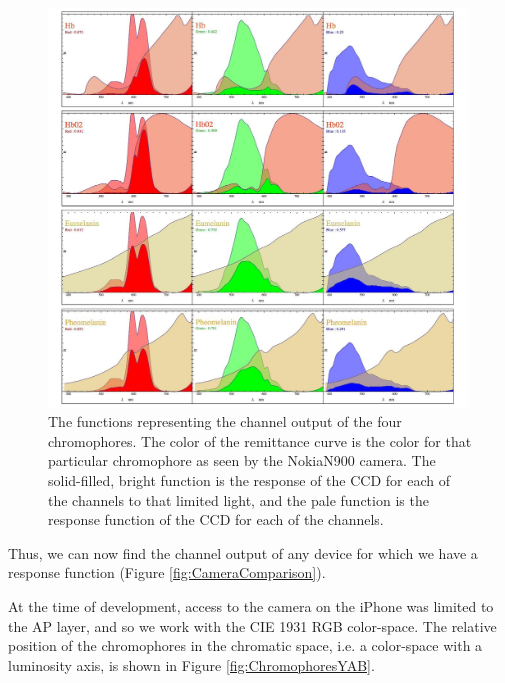 \begin{figure}[h!]
  \centering
    \includegraphics[width=0.99\textwidth]{Chapter1/Figs/Chromophores_NokiaN900.jpg}
    \caption{The functions representing the channel output of the four chromophores. The color of the remittance curve is the color for that particular chromophore as seen by the NokiaN900 camera. The solid-filled, bright function is the response of the CCD for each of the channels to that limited light, and the pale function is the response function of the CCD for each of the channels.}  \label{fig:Chromophores_NokiaN900}
\end{figure}



Thus, we can now find the channel output of any device for which we have a response function (Figure \ref{fig:CameraComparison}).

At the time of development, access to the camera on the iPhone was limited to the AP layer, and so we work with the CIE 1931 RGB color-space. The relative position of the chromophores in the chromatic space, i.e. a color-space with a luminosity axis, is shown in Figure \ref{fig:ChromophoresYAB}.








